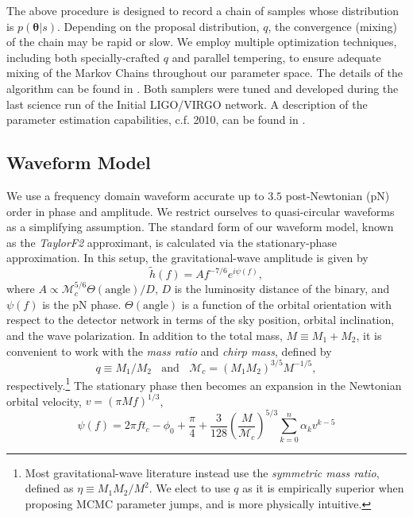 \documentclass[11pt,a4paper]{emulateapj}
\begin{document}
The above procedure is designed to record a chain of samples whose
distribution is $p\left(\boldsymbol{\theta}|s\right)$.  Depending on
the proposal distribution, $q$, the convergence (mixing) of the chain
may be rapid or slow.  We employ multiple optimization techniques,
including both specially-crafted $q$ and parallel tempering, to ensure
adequate mixing of the Markov Chains throughout our parameter space.
The details of the algorithm can be found in
\citep{Sluys08,spinspiral2009, spinspiral2010}.  Both samplers were tuned and 
developed during the last science run of the Initial LIGO/VIRGO network.  
A description of the parameter estimation capabilities, c.f. 2010, can be found
in \cite{S6PE}.
  
 
\subsection{Waveform Model}
\label{waveformSection}
  
We use a frequency domain waveform accurate up to $3.5$
post-Newtonian (pN) order in phase and amplitude.  We restrict ourselves to
quasi-circular waveforms as a simplifying assumption.  The standard
form of our waveform model, known as the \textit{TaylorF2}
approximant, is calculated via the stationary-phase approximation.
  In this setup, the gravitational-wave
amplitude is given by
\begin{equation}
\tilde{h}(f) = A f^{-7/6}e^{i \psi(f)},
\label{amplitude}
\end{equation}
where $A \propto \mathcal{M}_c^{5/6}\Theta(\text{angle})/D$, $D$ is
the luminosity distance of the binary, and $\psi(f)$ is the pN phase.
$\Theta(\text{angle})$ is a function of the orbital orientation with
respect to the detector network in terms of the sky position, orbital
inclination, and the wave polarization.  In addition to the total
mass, $M\equiv M_1+M_2$, it is convenient to work with the
\textit{mass ratio} and \textit{chirp mass}, defined by
\begin{equation}
  q\equiv M_1/M_2~~~~\text{and}~~~~\mathcal{M}_c = (M_1 M_2)^{3/5} M^{-1/5},
\end{equation}
respectively.\footnote{Most gravitational-wave literature instead use the \textit{symmetric mass ratio}, defined as $\eta \equiv M_1 M_2 / M^2$.  We elect to use $q$ as it is empirically superior when proposing MCMC parameter jumps, and is more physically intuitive.}  The stationary phase then becomes an expansion in the 
Newtonian orbital velocity, $v=(\pi M f)^{1/3}$, 
\begin{equation}
\psi(f) = 2 \pi f t_c - \phi_0 + \frac{\pi}{4} + \frac{3}{128}\left(\frac{M}{\mathcal{M}_c}\right)^{5/3}\sum^{n}_{k=0}\alpha_{k}v^{k-5}
\label{phase}
\end{equation}
\end{document}
